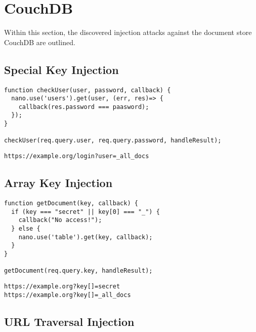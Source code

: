 \section{CouchDB}
Within this section, the discovered injection attacks against the document store CouchDB are outlined.

\subsection{Special Key Injection}

\begin{lstlisting}[caption={Vulnerable NodeJS example for special key injection on CouchDB}, label={lst:PHPArrayInjection}]
function checkUser(user, password, callback) {
  nano.use('users').get(user, (err, res)=> {
    callback(res.password === paasword);
  });
}

checkUser(req.query.user, req.query.password, handleResult);
\end{lstlisting}

\begin{lstlisting}[caption={Attack vector on CouchDB for speical key injection via HTTP GET}, label={lst:PHPArrayInjection}]
https://example.org/login?user=_all_docs
\end{lstlisting}

\subsection{Array Key Injection}

\begin{lstlisting}[caption={Vulnerable NodeJS example for array key injection on CouchDB}, label={lst:PHPArrayInjection}]
function getDocument(key, callback) {
  if (key === "secret" || key[0] === "_") {
    callback("No access!");
  } else {
    nano.use('table').get(key, callback);
  }
}

getDocument(req.query.key, handleResult);
\end{lstlisting}

\begin{lstlisting}[caption={Attack vectors on CouchDB for array key injection via HTTP GET}, label={lst:PHPArrayInjection}]
https://example.org?key[]=secret
https://example.org?key[]=_all_docs
\end{lstlisting}

\subsection{URL Traversal Injection}

